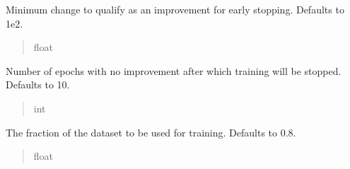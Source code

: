 \documentclass[letterpaper,10pt,english]{sphinxmanual}
\begin{document}
\begin{fulllineitems}
\begin{fulllineitems}
\label{\detokenize{modules:application.algorithms.autoencoder.AutoEncoderConfiguration.AutoEncoderConfiguration.early_stopping_delta}}
\pysigstartsignatures
{}
\pysigstopsignatures
\sphinxAtStartPar
Minimum change to qualify as an improvement for early stopping. Defaults to 1e\sphinxhyphen{}2.
\begin{quote}\begin{description}
\sphinxAtStartPar
float

\end{description}\end{quote}

\end{fulllineitems}


\begin{fulllineitems}
\label{\detokenize{modules:application.algorithms.autoencoder.AutoEncoderConfiguration.AutoEncoderConfiguration.early_stopping_patience}}
\pysigstartsignatures
{}
\pysigstopsignatures
\sphinxAtStartPar
Number of epochs with no improvement after which training will be stopped. Defaults to 10.
\begin{quote}\begin{description}
\sphinxAtStartPar
int

\end{description}\end{quote}

\end{fulllineitems}


\begin{fulllineitems}
\label{\detokenize{modules:application.algorithms.autoencoder.AutoEncoderConfiguration.AutoEncoderConfiguration.split}}
\pysigstartsignatures
{}
\pysigstopsignatures
\sphinxAtStartPar
The fraction of the dataset to be used for training. Defaults to 0.8.
\begin{quote}\begin{description}
\sphinxAtStartPar
float

\end{description}\end{quote}

\end{fulllineitems}


\end{fulllineitems}
\end{document}
